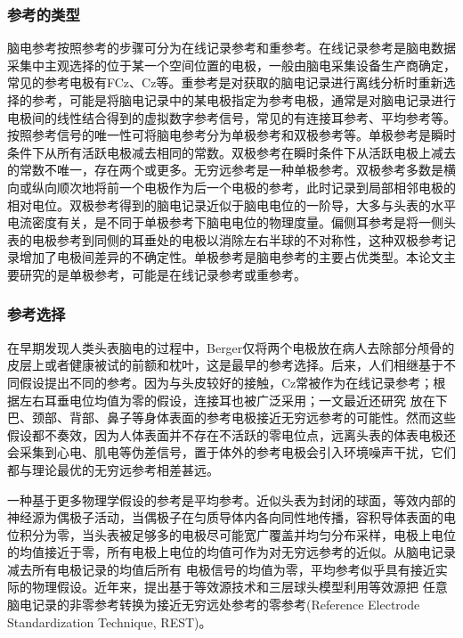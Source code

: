 \subsubsection{参考的类型}
脑电参考按照参考的步骤可分为在线记录参考和重参考。在线记录参考是脑电数据采集中主观选择的位于某一个空间位置的电极，一般由脑电采集设备生产商确定，常见的参考电极有FCz、Cz等。重参考是对获取的脑电记录进行离线分析时重新选择的参考，可能是将脑电记录中的某电极指定为参考电极，通常是对脑电记录进行电极间的线性结合得到的虚拟数字参考信号，常见的有连接耳参考、平均参考等。按照参考信号的唯一性可将脑电参考分为单极参考和双极参考等。单极参考是瞬时条件下从所有活跃电极减去相同的常数。双极参考在瞬时条件下从活跃电极上减去的常数不唯一，存在两个或更多。无穷远参考是一种单极参考。双极参考多数是横向或纵向顺次地将前一个电极作为后一个电极的参考，此时记录到局部相邻电极的相对电位。双极参考得到的脑电记录近似于脑电电位的一阶导，大多与头表的水平电流密度有关，是不同于单极参考下脑电电位的物理度量。偏侧耳参考是将一侧头表的电极参考到同侧的耳垂处的电极以消除左右半球的不对称性，这种双极参考记录增加了电极间差异的不确定性。单极参考是脑电参考的主要占优类型。本论文主要研究的是单极参考，可能是在线记录参考或重参考。

\subsubsection{参考选择}
在早期发现人类头表脑电的过程中，Berger仅将两个电极放在病人去除部分颅骨的皮层上或者健康被试的前额和枕叶，这是最早的参考选择。后来，人们相继基于不同假设提出不同的参考。因为与头皮较好的接触，Cz常被作为在线记录参考；根据左右耳垂电位均值为零的假设，连接耳也被广泛采用；\cite{kulaichev_optimal_2016}一文最近还研究
放在下巴、颈部、背部、鼻子等身体表面的参考电极接近无穷远参考的可能性。然而这些假设都不奏效，因为人体表面并不存在不活跃的零电位点，远离头表的体表电极还会采集到心电、肌电等伪差信号，置于体外的参考电极会引入环境噪声干扰，它们都与理论最优的无穷远参考相差甚远。

一种基于更多物理学假设的参考是平均参考。近似头表为封闭的球面，等效内部的神经源为偶极子活动，当偶极子在匀质导体内各向同性地传播，容积导体表面的电位积分为零，当头表被足够多的电极尽可能宽广覆盖并均匀分布采样，电极上电位的均值接近于零，所有电极上电位的均值可作为对无穷远参考的近似。从脑电记录减去所有电极记录的均值后所有
电极信号的均值为零，平均参考似乎具有接近实际的物理假设。近年来，\cite{yao_method_2001}提出基于等效源技术和三层球头模型利用等效源把
任意脑电记录的非零参考转换为接近无穷远处参考的零参考(Reference Electrode Standardization Technique, REST)。

